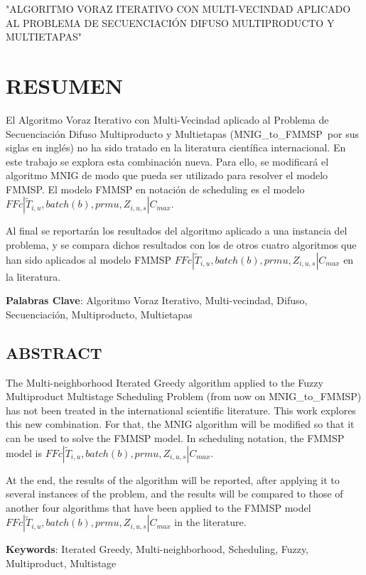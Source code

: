 \documentclass{article}
\def\algmod{MNIG\_to\_FMMSP} %
\def\notac_modelo{$FFc | \tilde{T}_{i, u}, batch(b), prmu, Z_{i, u, s} | C_{max}$}
\begin{document}
"ALGORITMO VORAZ ITERATIVO CON MULTI-VECINDAD APLICADO AL PROBLEMA DE SECUENCIACIÓN DIFUSO MULTIPRODUCTO Y \linebreak MULTIETAPAS"

\newpage

\section{RESUMEN}

El Algoritmo Voraz Iterativo con Multi-Vecindad aplicado al Problema de Secuenciación Difuso Multiproducto y Multietapas (\algmod\ por sus siglas en inglés) no ha sido tratado en la literatura científica internacional. En este trabajo se explora esta combinación nueva. Para ello, se modificará el algoritmo MNIG de modo que pueda ser utilizado para resolver el modelo FMMSP. El modelo FMMSP en notación de scheduling es el modelo \linebreak \notac_modelo.

\vspace{\baselineskip}
Al final se reportarán los resultados del algoritmo aplicado a una instancia del problema, y se compara dichos resultados con los de otros cuatro algoritmos que han sido aplicados al modelo FMMSP \notac_modelo en la literatura.

\vspace{\baselineskip}
\textbf{Palabras Clave}: Algoritmo Voraz Iterativo, Multi-vecindad, Difuso, Secuenciación, Multiproducto, Multietapas

\subsection{ABSTRACT}

The Multi-neighborhood Iterated Greedy algorithm applied to the Fuzzy Multiproduct Multistage Scheduling Problem (from now on \algmod) has not been treated in the international scientific literature. This work explores this new combination. For that, the MNIG algorithm will be modified so that it can be used to solve the FMMSP model. In scheduling notation, the FMMSP model is \notac_modelo.

\vspace{\baselineskip}
At the end, the results of the algorithm will be reported, after applying it to several instances of the problem, and the results will be compared to those of another four algorithms that have been applied to the FMMSP model \notac_modelo in the literature. 

\vspace{\baselineskip}
\par \textbf{Keywords}: Iterated Greedy, Multi-neighborhood, Scheduling, Fuzzy, Multiproduct, Multistage
\end{document}

